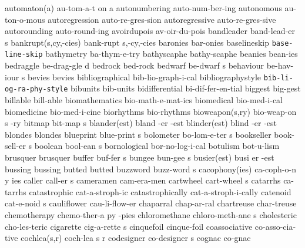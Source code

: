 \3 automaton(a)		au-tom-a-t on a         %
\1 autonumbering	auto-num-ber-ing	%
\1 autonomous		au-ton-o-mous		%
\NewWordtrue
\1 autoregression	auto-re-gres-sion	%
\NewWordtrue
\1 autoregressive	auto-re-gres-sive	%
\1 autorounding		auto-round-ing		%
\1 avoirdupois		av-oir-du-pois
\5 bandleader		band-lead-er s
\2 bankrupt(s,cy,-cies)	bank-rupt s,-cy,-cies
\1 baronies		bar-onies
\1 baselineskip 	{\tt\bs base-line-skip}
\1 bathymetry		ba-thym-e-try
\1 bathyscaphe		bathy-scaphe
\1 beanies		bean-ies
\NewWordtrue
\5 bedraggle		be-drag-gle d		%
\NewWordtrue
\1 bedrock		bed-rock		%
\NewWordtrue
\5 bedwarf		be-dwarf s		%
\5 behaviour		be-hav-iour s
\1 bevies		bevies
\NewWordtrue
\1 bibliographical	bib-lio-graph-i-cal	%
\1 bibliographystyle	{\tt\bs bib-li-og-ra-phy-style}
\NewWordtrue
\1 bibunits		bib-units       	%
\1 bidifferential	bi-dif-fer-en-tial
\1 biggest		big-gest
\1 billable		bill-able
\1 biomathematics	bio-math-e-mat-ics
\1 biomedical		bio-med-i-cal		%
\1 biomedicine		bio-med-i-cine
\1 biorhythms		bio-rhythms
\NewWordtrue
\3 bioweapon(s,ry)	bio-weap-on s -ry	%
\5 bitmap		bit-map s
\3 blander(est)		bland -er -est
\3 blinder(est)		blind -er -est
\1 blondes		blondes
\5 blueprint		blue-print s
\5 bolometer		bo-lom-e-ter s
\5 bookseller		book-sell-er s		%
\5 boolean		bool-ean s		%
\1 bornological 	bor-no-log-i-cal
\1 botulism		bot-u-lism
\1 brusquer		brusquer
\5 buffer		buf-fer s		%
\NewWordtrue
\5 bungee		bun-gee s		%
\3 busier(est)		busi er -est
\1 bussing		bussing
\1 butted		butted
\5 buzzword		buzz-word s
\3 cacophony(ies)	ca-coph-o-n y ies
\5 caller		call-er s		%
\1 cameramen		cam-era-men
\5 cartwheel		cart-wheel s
\1 catarrhs		ca-tarrhs
\1 catastrophic		cat-a-stroph-ic
\1 catastrophically	cat-a-stroph-i-cally
\5 catenoid		cat-e-noid s		%
\1 cauliflower		cau-li-flow-er
\1 chaparral		chap-ar-ral
\1 chartreuse		char-treuse
\6 chemotherapy 	chemo-ther-a py -pies   %
\5 chloromethane	chloro-meth-ane s	%
\1 cholesteric		cho-les-teric
\5 cigarette		cig-a-rette s
\1 cinquefoil		cinque-foil
\1 coassociative	co-asso-cia-tive	%
\NewWordtrue
\3 cochlea(s,r)		coch-lea s r		%
\NewWordtrue
\5 codesigner		co-designer s		%
\1 cognac		co-gnac
